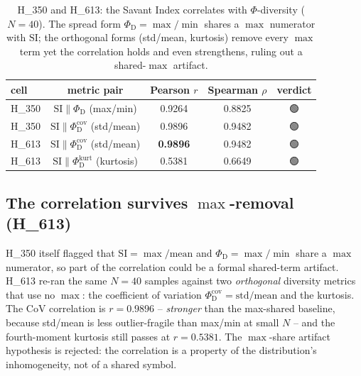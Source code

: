 \documentclass[11pt,a4paper]{article}
\providecommand{\tierGreen}{🟢}
\newcommand{\Svi}{\mathrm{SI}}
\newcommand{\PhiD}{\Phi_{\mathrm{D}}}
\begin{document}
\begin{table}[h]
\centering
\small
\begin{tabular}{lcccc}
\toprule
\textbf{cell} & \textbf{metric pair} & \textbf{Pearson $r$}
& \textbf{Spearman $\rho$} & \textbf{verdict} \\
\midrule
H\_350 & $\Svi \parallel \PhiD$ (max/min) & 0.9264 & 0.8825 & \tierGreen \\
H\_350 & $\Svi \parallel \PhiD^{\mathrm{cov}}$ (std/mean) & 0.9896 & 0.9482 & \tierGreen \\
H\_613 & $\Svi \parallel \PhiD^{\mathrm{cov}}$ (std/mean) & \textbf{0.9896} & 0.9482 & \tierGreen \\
H\_613 & $\Svi \parallel \PhiD^{\mathrm{kurt}}$ (kurtosis) & 0.5381 & 0.6649 & \tierGreen \\
\bottomrule
\end{tabular}
\caption{H\_350 and H\_613: the Savant Index correlates with
$\Phi$-diversity ($N=40$). The spread form $\PhiD=\max/\min$ shares a
$\max$ numerator with $\Svi$; the orthogonal forms (std/mean, kurtosis)
remove every $\max$ term yet the correlation holds and even strengthens,
ruling out a shared-$\max$ artifact.}
\label{tab:h350}
\end{table}

\subsection{The correlation survives $\max$-removal (H\_613)}
H\_350 itself flagged that $\Svi=\max/\mathrm{mean}$ and $\PhiD=\max/\min$
share a $\max$ numerator, so part of the correlation could be a formal
shared-term artifact. H\_613 re-ran the same $N=40$ samples against two
\emph{orthogonal} diversity metrics that use no $\max$: the coefficient of
variation $\PhiD^{\mathrm{cov}}=\mathrm{std}/\mathrm{mean}$ and the
kurtosis. The CoV correlation is $r=0.9896$ -- \emph{stronger} than the
max-shared baseline, because std/mean is less outlier-fragile than
max/min at small $N$ -- and the fourth-moment kurtosis still passes at
$r=0.5381$. The $\max$-share artifact hypothesis is rejected: the
correlation is a property of the distribution's inhomogeneity, not of a
shared symbol.
\end{document}
